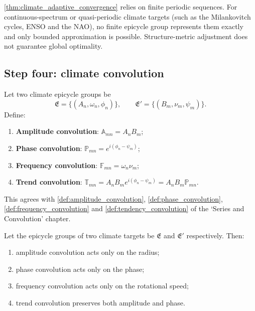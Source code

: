 \begin{remark}\label{rem:climate_adaptive_boundary}
\cref{thm:climate_adaptive_convergence} relies on finite periodic sequences. For continuous-spectrum or quasi-periodic climate targets (such as the Milankovitch cycles, ENSO and the NAO), no finite epicycle group represents them exactly and only bounded approximation is possible. Structure-metric adjustment does not guarantee global optimality.
\end{remark}

\subsection{Step four: climate convolution}

\begin{definition}\label{def:climate_convolution_types}
Let two climate epicycle groups be
\[
\mathfrak E=\{(A_n,\omega_n,\phi_n)\},\qquad
\mathfrak E'=\{(B_m,\nu_m,\psi_m)\}.
\]
Define:
\begin{enumerate}[label=(\roman*)]
    \item \textbf{Amplitude convolution}: $\mathbb A_{mn}=A_nB_m$;
    \item \textbf{Phase convolution}: $\mathbb P_{mn}=e^{i(\phi_n-\psi_m)}$;
    \item \textbf{Frequency convolution}: $\mathbb F_{mn}=\omega_n\nu_m$;
    \item \textbf{Trend convolution}: $\mathbb T_{mn}=A_nB_m e^{i(\phi_n-\psi_m)}=A_nB_m\mathbb P_{mn}$.
\end{enumerate}
This agrees with \cref{def:amplitude_convolution}, \cref{def:phase_convolution}, \cref{def:frequency_convolution} and \cref{def:tendency_convolution} of the `Series and Convolution' chapter.
\end{definition}

\begin{theorem}\label{thm:climate_convolution_action}
Let the epicycle groups of two climate targets be $\mathfrak E$ and $\mathfrak E'$ respectively. Then:
\begin{enumerate}[label=(\roman*)]
    \item amplitude convolution acts only on the radius;
    \item phase convolution acts only on the phase;
    \item frequency convolution acts only on the rotational speed;
    \item trend convolution preserves both amplitude and phase.
\end{enumerate}
\end{theorem}

